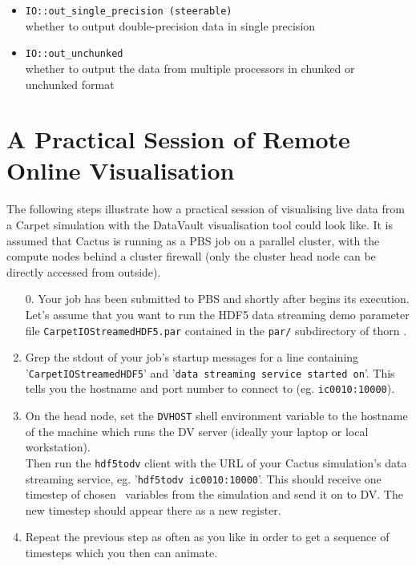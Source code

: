 \documentclass{article}
\begin{document}
\begin{itemize}
  \item {\tt IO::out\_single\_precision (steerable)}\\
        whether to output double-precision data in single precision

  \item {\tt IO::out\_unchunked}\\
        whether to output the data from multiple processors in chunked or
        unchunked format

\end{itemize}


\section{A Practical Session of Remote Online Visualisation}

The following steps illustrate how a practical session of visualising
live data from a Carpet simulation with the DataVault visualisation tool
could look like.
It is assumed that Cactus is running as a PBS job on a parallel cluster,
with the compute nodes behind a cluster firewall (only the cluster head node
can be directly accessed from outside).

\begin{enumerate}
  \item[0.] Your job has been submitted to PBS and shortly after begins its
        execution.\\
        Let's assume that you want to run the HDF5 data streaming
        demo parameter file {\tt CarpetIOStreamedHDF5.par} contained in the
        {\tt par/} subdirectory of thorn \ThisThorn.

  \item Grep the stdout of your job's startup messages for a line
        containing '{\tt CarpetIOStreamedHDF5}' and '{\tt data streaming
        service started on}'.
        This tells you the hostname and port number to connect to (eg. {\tt ic0010:10000}).

  \item On the head node, set the {\tt DVHOST} shell environment variable
        to the hostname of the machine which runs the DV server (ideally
        your laptop or local workstation).\\
        Then run the {\tt hdf5todv} client
        with the URL of your Cactus simulation's data streaming service, eg.
        '{\tt hdf5todv ic0010:10000}'. This should receive one timestep of
        chosen \ThisThorn\ variables from the simulation and
        send it on to DV. The new timestep should appear there as a new
        register.

  \item Repeat the previous step as often as you like in order
        to get a sequence of timesteps which you then can animate.

\end{enumerate}
\end{document}
